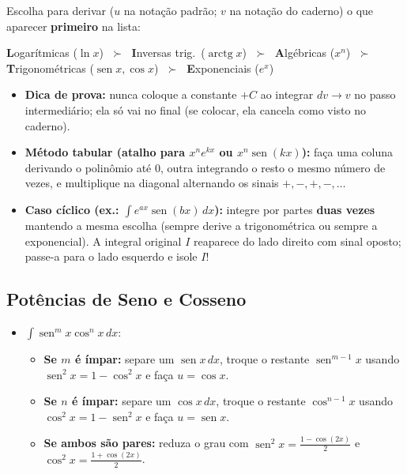 \documentclass[10pt,a4paper]{article}
\DeclareMathOperator{\sen}{sen}
\DeclareMathOperator{\arctg}{arctg}
\begin{document}
\begin{dica}
    Escolha para derivar ($u$ na notação padrão; $v$ na notação do caderno) o que aparecer \textbf{primeiro} na lista:
    \begin{center}
    \textbf{L}ogarítmicas ($\ln x$) $\;\succ\;$
    \textbf{I}nversas trig.\ ($\arctg x$) $\;\succ\;$
    \textbf{A}lgébricas ($x^n$) $\;\succ\;$
    \textbf{T}rigonométricas ($\sen x, \cos x$) $\;\succ\;$
    \textbf{E}xponenciais ($e^x$)
    \end{center}
    \begin{itemize}
        \item \textbf{Dica de prova:} nunca coloque a constante $+C$ ao integrar $dv \to v$ no passo intermediário; ela só vai no final (se colocar, ela cancela como visto no caderno).
        \item \textbf{Método tabular (atalho para $x^n e^{kx}$ ou $x^n \sen(kx)$):} faça uma coluna derivando o polinômio até $0$, outra integrando o resto o mesmo número de vezes, e multiplique na diagonal alternando os sinais $+, -, +, -, \dots$
        \item \textbf{Caso cíclico (ex.: $\int e^{ax}\sen(bx)\,dx$):} integre por partes \textbf{duas vezes} mantendo a mesma escolha (sempre derive a trigonométrica ou sempre a exponencial). A integral original $I$ reaparece do lado direito com sinal oposto; passe-a para o lado esquerdo e isole $I$!
    \end{itemize}
\end{dica}

\subsection{Potências de Seno e Cosseno}
\begin{itemize}
    \item $\displaystyle \int \sen^m x \cos^n x \, dx$:
          \begin{itemize}
              \item \textbf{Se $m$ é ímpar:} separe um $\sen x\,dx$, troque o restante $\sen^{m-1}x$ usando $\sen^2 x = 1 - \cos^2 x$ e faça $u = \cos x$.
              \item \textbf{Se $n$ é ímpar:} separe um $\cos x\,dx$, troque o restante $\cos^{n-1}x$ usando $\cos^2 x = 1 - \sen^2 x$ e faça $u = \sen x$.
              \item \textbf{Se ambos são pares:} reduza o grau com $\displaystyle \sen^2 x = \frac{1 - \cos(2x)}{2}$ e $\displaystyle \cos^2 x = \frac{1 + \cos(2x)}{2}$.
          \end{itemize}
\end{itemize}
\end{document}
